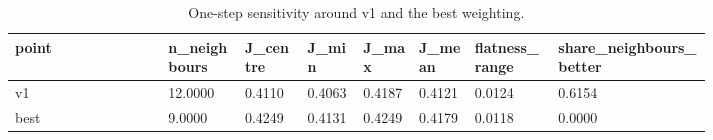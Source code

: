\begin{table}[htbp]
\centering\tiny
\caption{One-step sensitivity around v1 and the best weighting.}
\label{tab:sensitivity}
\setlength{\tabcolsep}{3pt}
\begin{tabular}{lp{0.114\linewidth}p{0.096\linewidth}p{0.083\linewidth}p{0.083\linewidth}p{0.087\linewidth}p{0.122\linewidth}p{0.223\linewidth}}
\toprule
point & n\_\allowbreak{}neighbours & J\_\allowbreak{}centre & J\_\allowbreak{}min & J\_\allowbreak{}max & J\_\allowbreak{}mean & flatness\_\allowbreak{}range & share\_\allowbreak{}neighbours\_\allowbreak{}better \\
\midrule
v1 & 12.0000 & 0.4110 & 0.4063 & 0.4187 & 0.4121 & 0.0124 & 0.6154 \\
best & 9.0000 & 0.4249 & 0.4131 & 0.4249 & 0.4179 & 0.0118 & 0.0000 \\
\bottomrule
\end{tabular}
\end{table}
